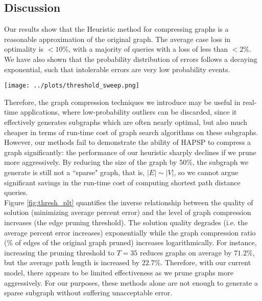 \documentclass[10.5pt,journal]{IEEEtran}
\begin{document}
	\subsection{Discussion}
		Our results show that the Heuristic method for compressing graphs is a reasonable approximation
		of the original graph. The average case loss in optimality is $<10\%$, with a majority of
		queries with a loss of less than $<2\%$. We have also shown that the probability distribution
		of errors follows a decaying exponential, such that intolerable errors are very low probability
		events.\\
		
		\begin{figure*}[] \centering
		\texttt{[image: ../plots/threshold\_sweep.png]} 
		\caption{Solution Quality degrades as the Graph Compression Increases}
		\label{fig:thresh_plt}
		\end{figure*}
		
		
		Therefore, the graph compression techniques we introduce may be useful in real-time
		applications, where low-probability outliers can be discarded, since it effectively
		generates subgraphs which are often nearly optimal, but also much cheaper in terms
		of run-time cost of graph search algorithms on these subgraphs. \\
		
		However, our methods fail to demonstrate the ability of HAPSP to compress a graph 
		significantly: the performance of our heuristic sharply declines if we prune more aggressively.
		By reducing the size of the graph by 50$\%$, the subgraph we generate is still not a ``sparse"
		graph, that is, $|E| \sim |V|$, so we cannot argue significant savings in the run-time cost of
		computing shortest path distance queries. \\
		
		Figure \ref{fig:thresh_plt} quantifies the inverse relationship between the quality of solution
		(minimizing average percent error) and the level of graph compression increases (the edge
		pruning threshold). The solution quality degrades (i.e. the average percent error increases)
		exponentially while the graph compression ratio (\% of edges of the original graph pruned)
		increases logarithmically. For instance, increasing the pruning threshold to $T=35$ reduces
		graphs on average by $71.2\%$, but the average path length is increased by $22.7\%$.
		Therefore, with our current model, there appears to be limited effectiveness as we 
		prune graphs more aggressively. For our purposes, these methods alone are not enough to
		generate a sparse subgraph without suffering unacceptable error.\\
		
\end{document}
